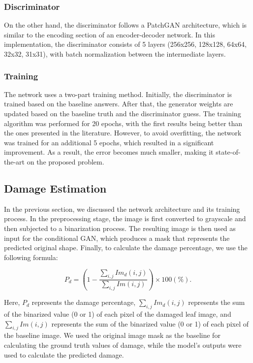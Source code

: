 \subsubsection{Discriminator}

On the other hand, the discriminator follows a PatchGAN architecture, which is similar to the encoding section of an encoder-decoder network. In this implementation, the discriminator consists of 5 layers (256x256, 128x128, 64x64, 32x32, 31x31), with batch normalization between the intermediate layers. 

\subsubsection{Training}

The network uses a two-part training method. Initially, the discriminator is trained based on the baseline answers. After that, the generator weights are updated based on the baseline truth and the discriminator guess. The training algorithm was performed for 20 epochs, with the first results being better than the ones presented in the literature. However, to avoid overfitting, the network was trained for an additional 5 epochs, which resulted in a significant improvement. As a result, the error becomes much smaller, making it state-of-the-art on the proposed problem.

\subsection{Damage Estimation}

In the previous section, we discussed the network architecture and its training process. In the preprocessing stage, the image is first converted to grayscale and then subjected to a binarization process. The resulting image is then used as input for the conditional GAN, which produces a mask that represents the predicted original shape. Finally, to calculate the damage percentage, we use the following formula:

\begin{equation}
	P_d = (1 - \frac{\sum_{i,j} Im_d(i,j)}{\sum_{i,j} Im(i,j)}) \times 100 (\%).
\end{equation}

Here, $P_d$ represents the damage percentage, $\sum_{i,j} Im_d(i,j)$ represents the sum of the binarized value (0 or 1) of each pixel of the damaged leaf image, and $\sum_{i,j} Im(i,j)$ represents the sum of the binarized value (0 or 1) of each pixel of the baseline image. We used the original image mask as the baseline for calculating the ground truth values of damage, while the model's outputs were used to calculate the predicted damage.

